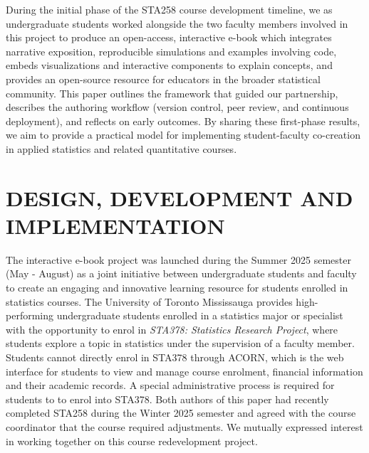 \documentclass[11pt]{article}
\begin{document}
During the initial phase of the STA258 course development timeline, we as undergraduate students worked alongside the two faculty members involved in this project to produce an open-access, interactive e-book which integrates narrative exposition, reproducible simulations and examples involving code, embeds visualizations and interactive components to explain concepts, and provides an open-source resource for educators in the broader statistical community.
This paper outlines the framework that guided our partnership, describes the authoring workflow (version control, peer review, and continuous deployment), and reflects on early outcomes. By sharing these first-phase results, we aim to provide a practical model for implementing student-faculty co-creation in applied statistics and related quantitative courses.

%
%


\section{DESIGN, DEVELOPMENT AND IMPLEMENTATION}
\label{sec:design}

The interactive e-book project was launched during the Summer 2025 semester (May - August) as a joint initiative between undergraduate students and faculty to create an engaging and innovative learning resource for students enrolled in statistics courses. 
The University of Toronto Mississauga provides high-performing undergraduate students enrolled in a statistics major or specialist with the opportunity to enrol in \textit{STA378: Statistics Research Project}, where students explore a topic in statistics under the supervision of a faculty member.
Students cannot directly enrol in STA378 through ACORN, which is the web interface for students to view and manage course enrolment, financial information and their academic records.
A special administrative process is required for students to to enrol into STA378.
Both authors of this paper had recently completed STA258 during the Winter 2025 semester and agreed with the course coordinator that the course required adjustments. 
We mutually expressed interest in working together on this course redevelopment project.
\end{document}
